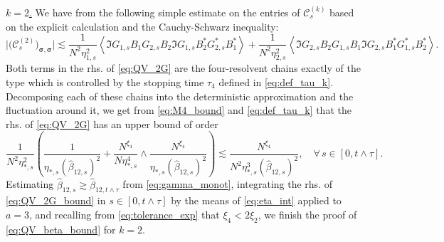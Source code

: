 \documentclass[10pt]{amsart}
\numberwithin{equation}{section}
\begin{document}
\noindent\underline{$k=2$.} We have from \cite[Eq.(5.28),(5.29)]{univ_extr} the following simple estimate on the entries of $\mathcal{C}^{(k)}_s$ based on the explicit calculation and the Cauchy-Schwarz inequality:
\begin{equation}
\Big\vert\big(\mathcal{C}^{(2)}_s\big)_{\bm{\sigma}, \bm{\sigma}}\Big\vert \lesssim \frac{1}{N^2\eta_{1,s}^2}\left\langle \Im G_{1,s}B_1G_{2,s} B_2 \Im G_{1,s}B_2^*G_{2,s}^* B_1^*\right\rangle + \frac{1}{N^2\eta_{2,s}^2} \left\langle \Im G_{2,s}B_2G_{1,s}B_1\Im G_{2,s} B_1^* G_{1,s}^*B_2^*\right\rangle.
\label{eq:QV_2G}
\end{equation} 
Both terms in the rhs. of \eqref{eq:QV_2G} are the four-resolvent chains exactly of the type which is controlled by the stopping time $\tau_4$ defined in \eqref{eq:def_tau_k}. Decomposing each of these chains into the deterministic approximation and the fluctuation around it, we get from \eqref{eq:M4_bound} and \eqref{eq:def_tau_k} that the rhs. of \eqref{eq:QV_2G} has an upper bound of order
\begin{equation}
\frac{1}{N^2\eta_{*,s}^2}\left( \frac{1}{\eta_{*,s}(\widehat{\beta}_{12,s})^2} + \frac{N^{\xi_4}}{N\eta_{*,s}^4}\wedge\frac{N^{\xi_4}}{\eta_{*,s}(\widehat{\beta}_{12,s})^2}\right)\lesssim \frac{N^{\xi_4}}{N^2\eta_{*,s}^3 (\widehat{\beta}_{12,s})^2},\quad \forall\, s\in [0,t\wedge\tau].
\label{eq:QV_2G_bound}
\end{equation}
Estimating $\widehat{\beta}_{12,s}\gtrsim \widehat{\beta}_{12,t\wedge\tau}$ from \eqref{eq:gamma_monot}, integrating the rhs. of \eqref{eq:QV_2G_bound} in $s\in [0,t\wedge\tau]$ by the means of \eqref{eq:eta_int} applied to $a=3$, and recalling from \eqref{eq:tolerance_exp} that $\xi_4<2\xi_2$, we finish the proof of \eqref{eq:QV_beta_bound} for $k=2$.


\medskip
\end{document}
